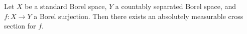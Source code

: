Let $X$ be a standard Borel space, $Y$ a countably separated Borel space, and $f: X \to Y$ a Borel surjection. Then there exists an absolutely measurable cross section for $f$.
